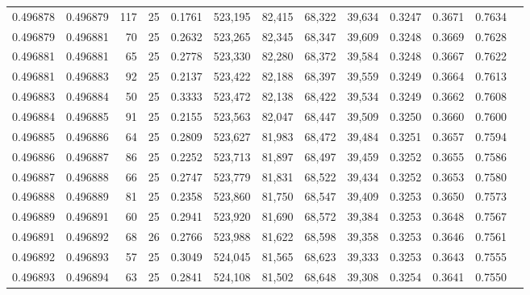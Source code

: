 \begin{tabular}{rrrrrrrrrrrrr}
0.496878 & 0.496879 &   117 &  25 &                                     0.1761 & 523,195 &  82,415 &  68,322 &  39,634 & 0.3247 & 0.3671 & 0.7634 \\
0.496879 & 0.496881 &    70 &  25 &                                     0.2632 & 523,265 &  82,345 &  68,347 &  39,609 & 0.3248 & 0.3669 & 0.7628 \\
0.496881 & 0.496881 &    65 &  25 &                                     0.2778 & 523,330 &  82,280 &  68,372 &  39,584 & 0.3248 & 0.3667 & 0.7622 \\
0.496881 & 0.496883 &    92 &  25 &                                     0.2137 & 523,422 &  82,188 &  68,397 &  39,559 & 0.3249 & 0.3664 & 0.7613 \\
0.496883 & 0.496884 &    50 &  25 &                                     0.3333 & 523,472 &  82,138 &  68,422 &  39,534 & 0.3249 & 0.3662 & 0.7608 \\
0.496884 & 0.496885 &    91 &  25 &                                     0.2155 & 523,563 &  82,047 &  68,447 &  39,509 & 0.3250 & 0.3660 & 0.7600 \\
0.496885 & 0.496886 &    64 &  25 &                                     0.2809 & 523,627 &  81,983 &  68,472 &  39,484 & 0.3251 & 0.3657 & 0.7594 \\
0.496886 & 0.496887 &    86 &  25 &                                     0.2252 & 523,713 &  81,897 &  68,497 &  39,459 & 0.3252 & 0.3655 & 0.7586 \\
0.496887 & 0.496888 &    66 &  25 &                                     0.2747 & 523,779 &  81,831 &  68,522 &  39,434 & 0.3252 & 0.3653 & 0.7580 \\
0.496888 & 0.496889 &    81 &  25 &                                     0.2358 & 523,860 &  81,750 &  68,547 &  39,409 & 0.3253 & 0.3650 & 0.7573 \\
0.496889 & 0.496891 &    60 &  25 &                                     0.2941 & 523,920 &  81,690 &  68,572 &  39,384 & 0.3253 & 0.3648 & 0.7567 \\
0.496891 & 0.496892 &    68 &  26 &                                     0.2766 & 523,988 &  81,622 &  68,598 &  39,358 & 0.3253 & 0.3646 & 0.7561 \\
0.496892 & 0.496893 &    57 &  25 &                                     0.3049 & 524,045 &  81,565 &  68,623 &  39,333 & 0.3253 & 0.3643 & 0.7555 \\
0.496893 & 0.496894 &    63 &  25 &                                     0.2841 & 524,108 &  81,502 &  68,648 &  39,308 & 0.3254 & 0.3641 & 0.7550 \\

\end{tabular}
